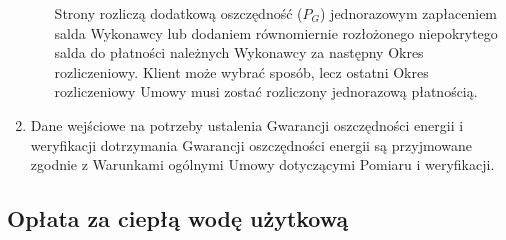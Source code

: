 \begin{enumerate}
\begin{enumerate}
Strony rozliczą dodatkową oszczędność ($P_G$) jednorazowym zapłaceniem salda Wykonawcy lub dodaniem równomiernie rozłożonego niepokrytego salda do płatności należnych Wykonawcy za następny Okres rozliczeniowy. Klient może wybrać sposób, lecz ostatni Okres rozliczeniowy Umowy musi zostać rozliczony jednorazową płatnością.
\end{enumerate}

	\item Dane wejściowe na potrzeby ustalenia Gwarancji oszczędności energii i weryfikacji dotrzymania Gwarancji oszczędności energii są przyjmowane zgodnie z Warunkami ogólnymi Umowy dotyczącymi Pomiaru i weryfikacji.
\end{enumerate}

\subsection{Opłata za ciepłą wodę użytkową}


